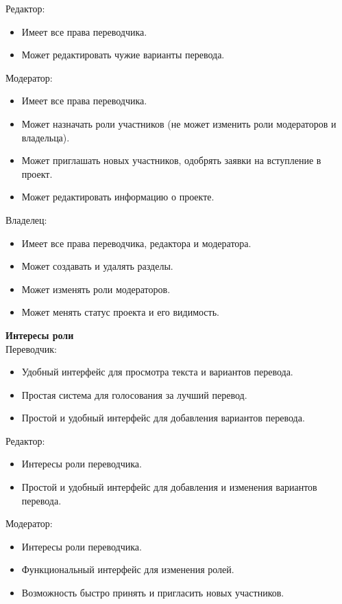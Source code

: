 \documentclass[a4paper,12pt]{article}
\begin{document}
Редактор:

\begin{itemize}
\item Имеет все права переводчика.
\item Может редактировать чужие варианты перевода.
\end{itemize}

Модератор:

\begin{itemize}
\item Имеет все права переводчика.
\item Может назначать роли участников (не может изменить роли модераторов и владельца).
\item Может приглашать новых участников, одобрять заявки на вступление в проект.
\item Может редактировать информацию о проекте.
\end{itemize}

Владелец:

\begin{itemize}
\item Имеет все права переводчика, редактора и модератора.
\item Может создавать и удалять разделы.
\item Может изменять роли модераторов.
\item Может менять статус проекта и его видимость.
\end{itemize}


\textbf{Интересы роли}\\

Переводчик:
\begin{itemize}
\item Удобный интерфейс для просмотра текста и вариантов перевода.
\item Простая система для голосования за лучший перевод.
\item Простой и удобный интерфейс для добавления вариантов перевода.
\end{itemize}

Редактор:
\begin{itemize}
\item Интересы роли переводчика.
\item Простой и удобный интерфейс для добавления и изменения вариантов перевода.
\end{itemize}

Модератор:

\begin{itemize}
\item Интересы роли переводчика.
\item Функциональный интерфейс для изменения ролей.
\item Возможность быстро принять и пригласить новых участников.
\end{itemize}
\end{document}
